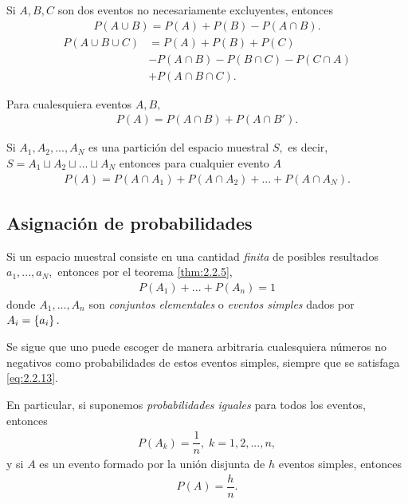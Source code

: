 \begin{teorema}
	\label{thm:2.2.6}
	Si $A,B,C$ son dos eventos no necesariamente excluyentes, entonces
	\begin{align}
		\label{eq:2.2.9}
		P(A\cup B)=P(A)+P(B)-P(A\cap B).
	\end{align}
	\begin{align}
		\label{eq:2.2.10}
		P(A\cup B \cup C)&=P(A)+P(B)+P(C)\\
		&-P(A\cap B)-P(B\cap C)-P(C\cap A)\\
		&+P(A\cap B \cap C).
	\end{align}
\end{teorema}



\begin{teorema}
	\label{thm:2.2.7}
	Para cualesquiera eventos $A,B,$
	\begin{align}
		\label{eq:2.2.11}
		P(A)=P(A\cap B)+P(A\cap B').
	\end{align}
\end{teorema}



\begin{teorema}
	\label{thm:2.2.8}
	Si $A_{1},A_{2},..., A_{N}$ es una partición del espacio muestral $S,$ es decir,
	$S=A_{1} \sqcup A_{2} \sqcup ... \sqcup A_{N}$ entonces para cualquier evento $A$
	\begin{align}
		\label{eq:2.2.12}
		P(A)=P(A\cap A_{1})+ P(A\cap A_{2}) + ... +P(A\cap A_{N}).
	\end{align}
\end{teorema}


\subsection{Asignación de probabilidades}

Si un espacio muestral consiste en una cantidad \emph{finita} de posibles resultados $a_{1},...,a_{N},$ entonces por el teorema \ref{thm:2.2.5},
\begin{align}
	\label{eq:2.2.13}
	P(A_{1})+...+P(A_{n})=1
\end{align}
donde $A_{1},...,A_{n}$ son \emph{conjuntos elementales} o \emph{eventos simples} dados por $A_{i}=\left\{ a_{i} \right\}.$


Se sigue que uno puede escoger de manera arbitraria cualesquiera números no negativos como probabilidades de estos eventos simples, siempre que se satisfaga \eqref{eq:2.2.13}.

En particular, si suponemos \emph{probabilidades iguales} para todos los eventos, entonces
\begin{align}
	\label{eq:2.2.14}
	P(A_{k})=\dfrac{1}{n}, \; k=1,2,...,n,
\end{align}
y si $A$ es un evento formado por la unión disjunta de $h$ eventos simples, entonces
\begin{align}
	\label{eq:2.2.15}
	P(A)=\dfrac{h}{n}.
\end{align}


